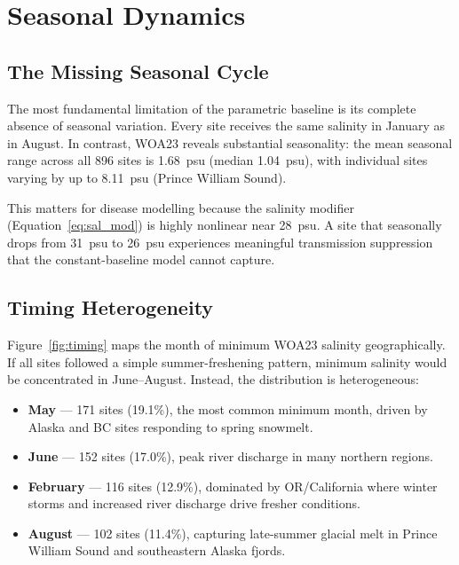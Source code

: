 \documentclass[11pt,a4paper]{article}
\begin{document}
\section{Seasonal Dynamics}

\subsection{The Missing Seasonal Cycle}

The most fundamental limitation of the parametric baseline is its complete
absence of seasonal variation. Every site receives the same salinity in January
as in August. In contrast, WOA23 reveals substantial seasonality: the mean
seasonal range across all 896 sites is 1.68~psu (median 1.04~psu), with
individual sites varying by up to 8.11~psu (Prince William Sound).

This matters for disease modelling because the salinity modifier
(Equation~\ref{eq:sal_mod}) is highly nonlinear near 28~psu. A site that
seasonally drops from 31~psu to 26~psu experiences meaningful transmission
suppression that the constant-baseline model cannot capture.

\subsection{Timing Heterogeneity}

Figure~\ref{fig:timing} maps the month of minimum WOA23 salinity geographically.
If all sites followed a simple summer-freshening pattern, minimum salinity would
be concentrated in June--August. Instead, the distribution is heterogeneous:

\begin{itemize}
    \item \textbf{May} --- 171 sites (19.1\%), the most common minimum month,
    driven by Alaska and BC sites responding to spring snowmelt.
    \item \textbf{June} --- 152 sites (17.0\%), peak river discharge in many
    northern regions.
    \item \textbf{February} --- 116 sites (12.9\%), dominated by OR/California
    where winter storms and increased river discharge drive fresher conditions.
    \item \textbf{August} --- 102 sites (11.4\%), capturing late-summer glacial
    melt in Prince William Sound and southeastern Alaska fjords.
\end{itemize}
\end{document}
